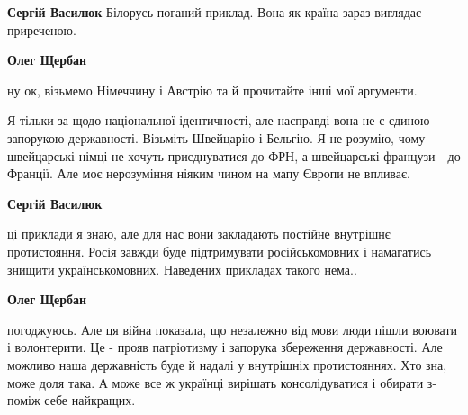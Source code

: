 \begin{itemize}
\begin{itemize}
 
\textbf{Сергій Василюк} Білорусь поганий приклад. Вона як країна зараз виглядає приреченою.

 
\textbf{Олег Щербан} 

ну ок, візьмемо Німеччину і Австрію та й прочитайте інші мої аргументи.

Я тільки за щодо національної ідентичності, але насправді вона не є єдиною
запорукою державності. Візьміть Швейцарію і Бельгію. Я не розумію, чому
швейцарські німці не хочуть приєднуватися до ФРН, а швейцарські французи - до
Франції. Але моє нерозуміння ніяким чином на мапу Європи не впливає.


 
\textbf{Сергій Василюк} 

ці приклади я знаю, але для нас вони закладають постійне внутрішнє
протистояння. Росія завжди буде підтримувати російськомовних і намагатись
знищити українськомовних. Наведених прикладах такого нема..

 
\textbf{Олег Щербан} 

погоджуюсь. Але ця війна показала, що незалежно від мови люди пішли воювати і
волонтерити. Це - прояв патріотизму і запорука збереження державності. Але
можливо наша державність буде й надалі у внутрішніх протистояннях. Хто зна,
може доля така. А може все ж українці вирішать консолідуватися і обирати
з-поміж себе найкращих.


 


\end{itemize}
\end{itemize}
